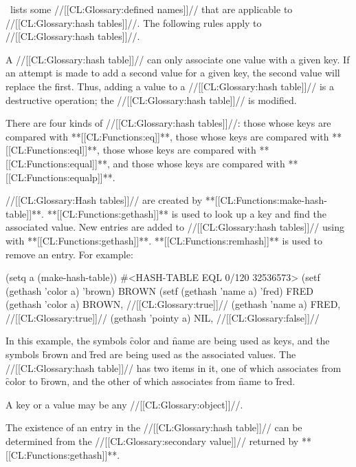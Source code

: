 


\Thenextfigure\ lists some //[[CL:Glossary:defined names]]// that are applicable  to //[[CL:Glossary:hash tables]]//.  The following rules apply to //[[CL:Glossary:hash tables]]//.

\beginlist \itemitem{--} A //[[CL:Glossary:hash table]]// can only associate one value with a given key. If an attempt is made to add a second value for a given key, the second value will replace the first. Thus, adding a value to a //[[CL:Glossary:hash table]]// is a destructive operation; the //[[CL:Glossary:hash table]]// is modified.  

\itemitem{--} There are four kinds of //[[CL:Glossary:hash tables]]//:
  those whose keys are compared with **[[CL:Functions:eq]]**,
  those whose keys are compared with **[[CL:Functions:eql]]**,
  those whose keys are compared with **[[CL:Functions:equal]]**, and 
  those whose keys are compared with **[[CL:Functions:equalp]]**.  

\itemitem{--} //[[CL:Glossary:Hash tables]]// are created by **[[CL:Functions:make-hash-table]]**.  **[[CL:Functions:gethash]]** is used to look up a key and find the associated value. New entries are added to //[[CL:Glossary:hash tables]]// using  with **[[CL:Functions:gethash]]**. **[[CL:Functions:remhash]]** is used to remove an entry. For example:

\code
 (setq a (make-hash-table)) \EV #<HASH-TABLE EQL 0/120 32536573>
 (setf (gethash 'color a) 'brown) \EV BROWN
 (setf (gethash 'name a) 'fred) \EV FRED
 (gethash 'color a) \EV BROWN, //[[CL:Glossary:true]]//
 (gethash 'name a) \EV FRED, //[[CL:Glossary:true]]//
 (gethash 'pointy a) \EV NIL, //[[CL:Glossary:false]]// \endcode

In this example, the symbols \f{color} and \f{name} are being used as keys, and the symbols \f{brown} and \f{fred} are being used as the associated values.  The //[[CL:Glossary:hash table]]//  has two items in it, one of which                               associates from \f{color} to \f{brown}, and the other of which associates from \f{name} to \f{fred}.

\itemitem{--} A key or a value may be any //[[CL:Glossary:object]]//.


\itemitem{--}

The existence of an entry in the //[[CL:Glossary:hash table]]// can be determined from the //[[CL:Glossary:secondary value]]// returned by **[[CL:Functions:gethash]]**. \endlist               

